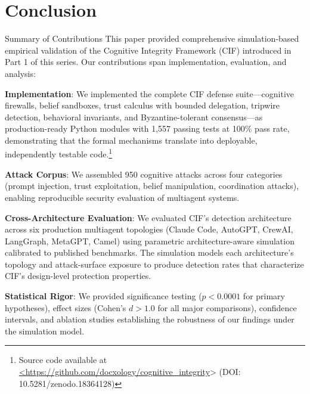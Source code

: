 \documentclass[
  ignorenonframetext,
]{beamer}
\author{\texorpdfstring{}{}}
\date{}
\begin{document}
\begin{frame}
\newpage
\end{frame}

\section{Conclusion}\label{sec:conclusion}

\begin{frame}{Summary of Contributions}
\protect{}\label{summary-of-contributions}
This paper provided comprehensive simulation-based empirical validation
of the Cognitive Integrity Framework (CIF) introduced in Part 1 of this
series. Our contributions span implementation, evaluation, and analysis:

\textbf{Implementation}: We implemented the complete CIF defense
suite---cognitive firewalls, belief sandboxes, trust calculus with
bounded delegation, tripwire detection, behavioral invariants, and
Byzantine-tolerant consensus---as production-ready Python modules with
1,557 passing tests at 100\% pass rate, demonstrating that the formal
mechanisms translate into deployable, independently testable
code.\footnote{Source code available at \url{<https://github.com/docxology/cognitive_integrity}> (DOI: 10.5281/zenodo.18364128)}

\textbf{Attack Corpus}: We assembled 950 cognitive attacks across four
categories (prompt injection, trust exploitation, belief manipulation,
coordination attacks), enabling reproducible security evaluation of
multiagent systems.

\textbf{Cross-Architecture Evaluation}: We evaluated CIF's detection
architecture across six production multiagent topologies (Claude Code,
AutoGPT, CrewAI, LangGraph, MetaGPT, Camel) using parametric
architecture-aware simulation calibrated to published benchmarks. The
simulation models each architecture's topology and attack-surface
exposure to produce detection rates that characterize CIF's design-level
protection properties.

\textbf{Statistical Rigor}: We provided significance testing
(\(p < 0.0001\) for primary hypotheses), effect sizes (Cohen's
\(d > 1.0\) for all major comparisons), confidence intervals, and
ablation studies establishing the robustness of our findings under the
simulation model.
\end{frame}
\end{document}
